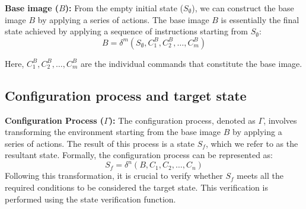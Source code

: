 \textbf{Base image ($B$):}
From the empty initial state ($S_\emptyset$), we can construct the base image $B$ by applying a series of actions. The base image $B$ is essentially the final state achieved by applying a sequence of instructions starting from $S_\emptyset$:
\begin{equation}
B = \delta^m(S_{\emptyset}, {C^{B}_1, C^{B}_2, \ldots, C^{B}_m})
\label{eq:base_image}
\end{equation}

Here, ${C^{B}_1, C^{B}_2, \ldots, C^{B}_m}$ are the individual commands that constitute the base image.
\vspace{-0.5em}

\subsection{Configuration process and target state}
\vspace{-0.5em}

\textbf{Configuration Process ($\Gamma$):}
The configuration process, denoted as $\Gamma$, involves transforming the environment starting from the base image $B$ by applying a series of actions. The result of this process is a state $S_f$, which we refer to as the resultant state. Formally, the configuration process can be represented as:
\begin{equation}
S_f = \delta^n\left(B, {C_1, C_2, \ldots, C_n}\right)
\end{equation}
Following this transformation, it is crucial to verify whether $S_f$ meets all the required conditions to be considered the target state. This verification is performed using the state verification function.

